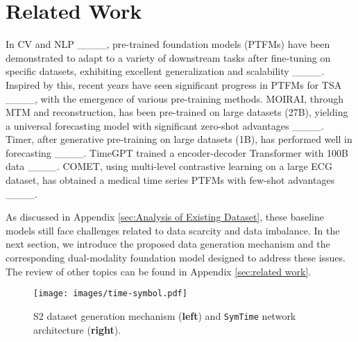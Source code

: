 \section{Related Work}
In CV and NLP ____, pre-trained foundation models (PTFMs) have been demonstrated to adapt to a variety of downstream tasks after fine-tuning on specific datasets, exhibiting excellent generalization and scalability ____. Inspired by this, recent years have seen significant progress in PTFMs for TSA ____, with the emergence of various pre-training methods. MOIRAI, through MTM and reconstruction, has been pre-trained on large datasets (27B), yielding a universal forecasting model with significant zero-shot advantages ____. Timer, after generative pre-training on large datasets (1B), has performed well in forecasting ____. TimeGPT trained a encoder-decoder Transformer with 100B data ____. COMET, using multi-level contrastive learning on a large ECG dataset, has obtained a medical time series PTFMs with few-shot advantages ____. 

As discussed in Appendix \ref{sec:Analysis of Existing Dataset}, these baseline models still face challenges related to data scarcity and data imbalance. In the next section, we introduce the proposed data generation mechanism and the corresponding dual-modality foundation model designed to address these issues. The review of other topics can be found in Appendix \ref{sec:related work}.

\begin{figure*}[!t]
\centerline{\texttt{[image: images/time-symbol.pdf]}}
\vskip -0.05in
\caption{S2 dataset generation mechanism (\textbf{left}) and \texttt{SymTime} network architecture (\textbf{right}).}
\label{figure:symtime}
\end{figure*}